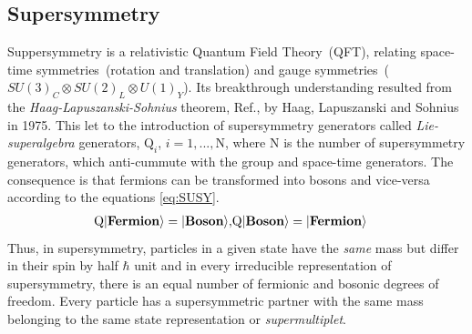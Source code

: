 \subsection{Supersymmetry}
Suppersymmetry is a relativistic Quantum Field Theory~(QFT), relating space-time symmetries~(rotation and translation) and 
gauge symmetries~($SU(3)_{C}\otimes SU(2)_{L}\otimes U(1)_{Y}$).
Its breakthrough understanding resulted from the \textit{Haag-Lapuszanski-Sohnius} theorem, Ref.\cite{MSUSY}, by Haag, Lapuszanski and Sohnius 
in 1975. This let to the introduction of supersymmetry generators called \textit{Lie-superalgebra} generators, $\mathrm{Q}_{i}$, $i = 1,...,\mathrm{N}$, where $\mathrm{N}$ is the number of supersymmetry generators, which anti-cummute with the group and space-time generators. The consequence is that fermions can be transformed into bosons and vice-versa according to the 
equations \ref{eq:SUSY}.
\begin{eqnarray}{\label{eq:SUSY}}
\mathrm{Q}|\textbf{Fermion}\rangle =|\textbf{Boson}\rangle,    &
\mathrm{Q}|\textbf{Boson}\rangle  =|\textbf{Fermion} \rangle 
\end{eqnarray}
Thus, in supersymmetry, particles in a given state  have the \textit{same} mass but differ in their spin by half $\hbar$ unit and in every irreducible representation of supersymmetry, there is an equal number of fermionic and bosonic degrees of freedom. Every particle has a supersymmetric partner with the same mass belonging to the same  state representation or \textit{supermultiplet}.

